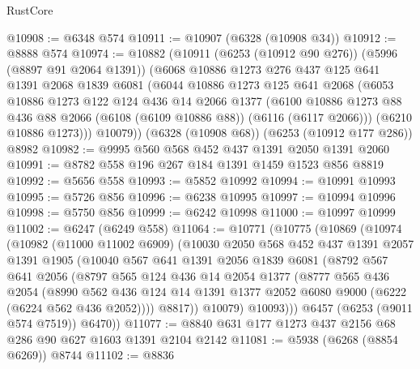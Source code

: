 \begin{lexlean}{RustCore}
\begin{coremodule}
@10908 := @6348 @574
@10911 := @10907 (@6328 (@10908 @34))
@10912 := @8888 @574
@10974 := @10882
    (@10911
      (@6253 (@10912 @90 @276))
      (@5996 (@8897 @91 @2064 @1391))
      (@6068
        @10886
        @1273
        @276
        @437
        @125
        @641
        @1391
        @2068
        @1839
        @6081
        (@6044
          @10886
          @1273
          @125
          @641
          @2068
          (@6053
            @10886
            @1273
            @122
            @124
            @436
            @14
            @2066
            @1377
            (@6100 @10886 @1273 @88 @436 @88 @2066 (@6108 (@6109 @10886 @88)) (@6116 (@6117 @2066)))
            (@6210 @10886 @1273)))
        @10079))
    (@6328 (@10908 @68))
    (@6253 (@10912 @177 @286))
    @8982
@10982 := @9995 @560 @568 @452 @437 @1391 @2050 @1391 @2060
@10991 := @8782 @558 @196 @267 @184 @1391 @1459 @1523 @856 @8819
@10992 := @5656 @558
@10993 := @5852 @10992
@10994 := @10991 @10993
@10995 := @5726 @856
@10996 := @6238 @10995
@10997 := @10994 @10996
@10998 := @5750 @856
@10999 := @6242 @10998
@11000 := @10997 @10999
@11002 := @6247 (@6249 @558)
@11064 := @10771
    (@10775
      (@10869
        (@10974
          (@10982
            (@11000 @11002 @6909)
            (@10030
              @2050
              @568
              @452
              @437
              @1391
              @2057
              @1391
              @1905
              (@10040
                @567
                @641
                @1391
                @2056
                @1839
                @6081
                (@8792
                  @567
                  @641
                  @2056
                  (@8797
                    @565
                    @124
                    @436
                    @14
                    @2054
                    @1377
                    (@8777
                      @565
                      @436
                      @2054
                      (@8990
                        @562
                        @436
                        @124
                        @14
                        @1391
                        @1377
                        @2052
                        @6080
                        @9000
                        (@6222 (@6224 @562 @436 @2052))))
                    @8817))
                @10079)
              @10093)))
        @6457
        (@6253 (@9011 @574 @7519))
        @6470))
@11077 := @8840 @631 @177 @1273 @437 @2156 @68 @286 @90 @627 @1603 @1391 @2104 @2142
@11081 := @5938 (@6268 (@8854 @6269)) @8744
@11102 := @8836

\end{coremodule}
\end{lexlean}
